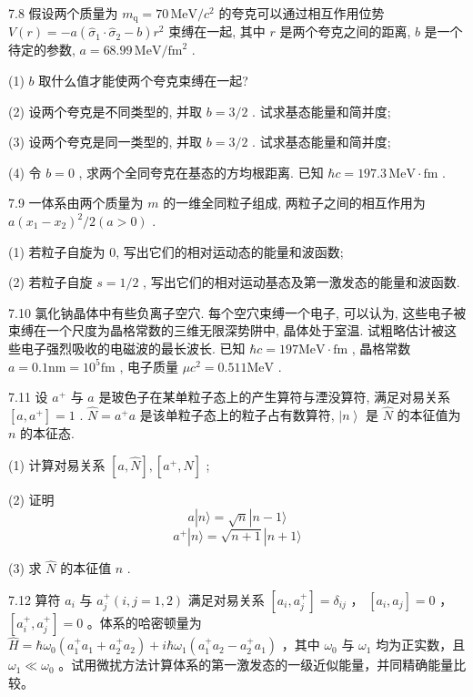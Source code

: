 \vfill\newpage

7.8 假设两个质量为 $m_{\mathrm{q}} = 70 \, \mathrm{MeV} / c^2$ 的夸克可以通过相互作用位势 $V(r) = -a(\hat{\sigma}_1 \cdot \hat{\sigma}_2 - b)r^2$ 束缚在一起, 其中 $r$ 是两个夸克之间的距离, $b$ 是一个待定的参数, $a = 68.99 \, \mathrm{MeV} / \mathrm{fm}^2$ . 

(1) $b$ 取什么值才能使两个夸克束缚在一起? 

(2) 设两个夸克是不同类型的, 并取 $b = 3/2$ . 试求基态能量和简并度; 

(3) 设两个夸克是同一类型的, 并取 $b = 3/2$ . 试求基态能量和简并度; 

(4) 令 $b = 0$ , 求两个全同夸克在基态的方均根距离. 已知 $\hbar c = 197.3 \, \mathrm{MeV} \cdot \mathrm{fm}$ .

\vfill\newpage

7.9 一体系由两个质量为 $m$ 的一维全同粒子组成, 两粒子之间的相互作用为 $a(x_{1} - x_{2})^{2} / 2 (a > 0)$ . 

(1) 若粒子自旋为 0, 写出它们的相对运动态的能量和波函数; 

(2) 若粒子自旋 $s = 1 / 2$ , 写出它们的相对运动基态及第一激发态的能量和波函数.

\vfill\newpage

7.10 氯化钠晶体中有些负离子空穴. 每个空穴束缚一个电子, 可以认为, 这些电子被束缚在一个尺度为晶格常数的三维无限深势阱中, 晶体处于室温. 试粗略估计被这些电子强烈吸收的电磁波的最长波长. 已知 $\hbar c = 197\mathrm{MeV}\cdot \mathrm{fm}$ , 晶格常数 $a = 0.1\mathrm{nm} = 10^{5}\mathrm{fm}$ , 电子质量 $\mu c^2 = 0.511\mathrm{MeV}$ .

\vfill\newpage

7.11 设 $a^+$ 与 $a$ 是玻色子在某单粒子态上的产生算符与湮没算符, 满足对易关系 $[a, a^+] = 1$ . $\hat{N} = a^+ a$ 是该单粒子态上的粒子占有数算符, $\left|n\right\rangle$ 是 $\hat{N}$ 的本征值为 $n$ 的本征态. 

(1) 计算对易关系 $[a, \hat{N}], [a^+, \hat{N}]$ ; 

(2) 证明
\begin{equation}\tag{1}
    a | n \rangle = \sqrt {n} | n - 1 \rangle    
\end{equation}
\begin{equation}\tag{2}
    a ^ {+} | n \rangle = \sqrt {n + 1} | n + 1 \rangle
\end{equation}

(3) 求 $\hat{N}$ 的本征值 $n$ .

\vfill\newpage

7.12 算符 $a_{i}$ 与 $a_{j}^{+}(i,j = 1,2)$ 满足对易关系 $[a_i,a_j^+] = \delta_{ij}$ ， $[a_i,a_j] = 0$ ， $[a_i^+, a_j^+] = 0$ 。体系的哈密顿量为 $\hat{H} = \hbar \omega_0(a_1^+ a_1 + a_2^+ a_2) + i\hbar \omega_1(a_1^+ a_2 - a_2^+ a_1)$ ，其中 $\omega_0$ 与 $\omega_1$ 均为正实数，且 $\omega_1 \ll \omega_0$ 。试用微扰方法计算体系的第一激发态的一级近似能量，并同精确能量比较。

